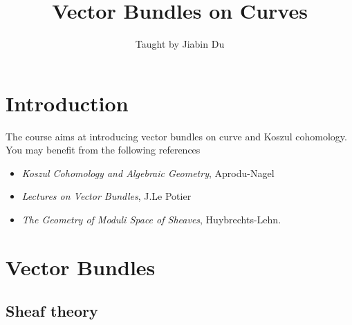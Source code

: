 \documentclass{ctexart}
\title{Vector Bundles on Curves}
\author{Taught by Jiabin Du}
\date{}
\begin{document}
\maketitle
\newpage

\tableofcontents
\newpage

\section*{Introduction}
\label{section:Introduction}

The course aims at introducing vector bundles on curve and Koszul cohomology.
You may benefit from the following references
\begin{itemize}
    \item \emph{Koszul Cohomology and Algebraic Geometry}, Aprodu-Nagel
    \item \emph{Lectures on Vector Bundles}, J.Le Potier
    \item \emph{The Geometry of Moduli Space of Sheaves}, Huybrechts-Lehn.
\end{itemize}

\section{Vector Bundles}
\label{section:Vector_Bundles}

\subsection{Sheaf theory}
\label{subsection:Vector_Bundles_Sheaf_theory}
\end{document}
